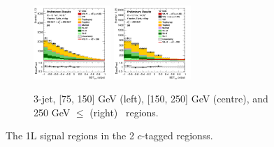 \begin{figure}[h!]
\begin{subfigure}[b]{\textwidth}
        \includegraphics[width=0.32\textwidth]{Images/VH/Own_fit/prefit_VHcc/Region_distmva_BMax250_BMin150_DSR_J3_TTypext_T2_L1_Y6051_Prefit.png}
        \includegraphics[width=0.32\textwidth]{Images/VH/Own_fit/prefit_VHcc/Region_distmva_BMin250_DSR_J3_TTypext_T2_L1_Y6051_Prefit.png}
        \caption{3-jet, [75, 150] GeV (left), [150, 250] GeV (centre), and 250  GeV $\leq$ (right) \ptv\ regions.}
        \label{fig:plots_VHcc_1L_SR_3J_2c}
    \end{subfigure}
    \caption{The 1L signal regions in the 2 $c$-tagged regionss.}
    \label{fig:plots_VHcc_1L_SR_2c}
\end{figure}
